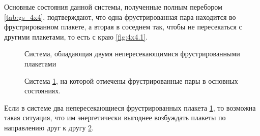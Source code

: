 \documentclass[utf8, babel, sor, jor, amsmath, amssymb, reprint]{elsarticle} %
\begin{document}
Основные состояния данной системы, полученные полным перебором \ref{tab:gs_4x4}, подтверждают, что одна фрустрированная пара находится во фрустрированном плакете, а вторая в соседнем так, чтобы не пересекаться с другими плакетами, то есть с краю \ref{fig:4x4.1}.

\begin{figure}[h]
	\centering
	\caption{Система, обладающая двумя непересекающимися фрустрированными плакетами}
	\label{fig:4x7}
\end{figure}
\begin{figure}[h]
	\centering
	\caption{Система \ref{fig:4x7}, на которой отмечены фрустрированные пары  в основных состояниях.}
	\label{fig:4x7F}
\end{figure}

Если в системе два непересекающиеся фрустрированных плакета \ref{fig:4x7}, то возможна такая ситуация, что им энергетически выгоднее возбуждать плакеты по направлению друг к другу \ref{fig:4x7F}.
\end{document}
